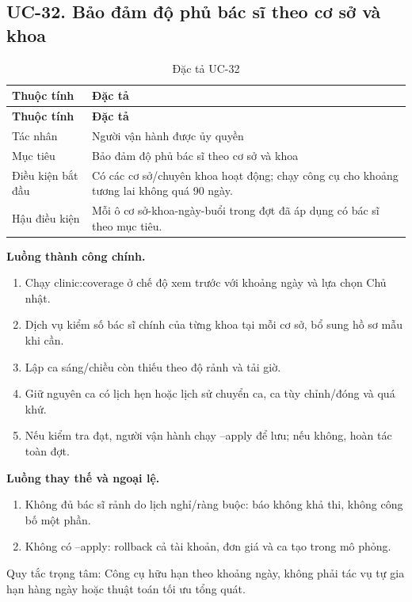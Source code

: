 \clearpage

\subsection{UC-32.\allowbreak{} Bảo đảm độ phủ bác sĩ theo cơ sở và khoa}
\label{uc:32}

{\small\setlength{\tabcolsep}{3pt}\renewcommand{\arraystretch}{1.12}
\begin{longtable}{@{}L{\textwidth-1.32pt\relax} L{\textwidth-4.68pt\relax}@{}}
\caption{Đặc tả UC-32}\\
\toprule
\textbf{Thuộc tính} & \textbf{Đặc tả}\\\midrule
\endfirsthead
\toprule
\textbf{Thuộc tính} & \textbf{Đặc tả}\\\midrule
\endhead
\bottomrule\endlastfoot
Tác nhân & Người vận hành được ủy quyền\\[3pt]
Mục tiêu & Bảo đảm độ phủ bác sĩ theo cơ sở và khoa\\[3pt]
Điều kiện bắt đầu & Có các cơ sở/\allowbreak{}chuyên khoa hoạt động; chạy công cụ cho khoảng tương lai không quá 90 ngày.\allowbreak{}\\[3pt]
Hậu điều kiện & Mỗi ô cơ sở-khoa-ngày-buổi trong đợt đã áp dụng có bác sĩ theo mục tiêu.\allowbreak{}\\[3pt]
\end{longtable}}
\noindent\textbf{Luồng thành công chính.}
\begin{enumerate}
\item Chạy clinic:\allowbreak{}coverage ở chế độ xem trước với khoảng ngày và lựa chọn Chủ nhật.\allowbreak{}
\item Dịch vụ kiểm số bác sĩ chính của từng khoa tại mỗi cơ sở, bổ sung hồ sơ mẫu khi cần.\allowbreak{}
\item Lập ca sáng/\allowbreak{}chiều còn thiếu theo độ rảnh và tải giờ.\allowbreak{}
\item Giữ nguyên ca có lịch hẹn hoặc lịch sử chuyển ca, ca tùy chỉnh/\allowbreak{}đóng và quá khứ.\allowbreak{}
\item Nếu kiểm tra đạt, người vận hành chạy --apply để lưu; nếu không, hoàn tác toàn đợt.\allowbreak{}
\end{enumerate}
\noindent\textbf{Luồng thay thế và ngoại lệ.}
\begin{enumerate}
\item Không đủ bác sĩ rảnh do lịch nghỉ/\allowbreak{}ràng buộc:\allowbreak{} báo không khả thi, không công bố một phần.\allowbreak{}
\item Không có --apply:\allowbreak{} rollback cả tài khoản, đơn giá và ca tạo trong mô phỏng.\allowbreak{}
\end{enumerate}
Quy tắc trọng tâm:\allowbreak{} Công cụ hữu hạn theo khoảng ngày, không phải tác vụ tự gia hạn hàng ngày hoặc thuật toán tối ưu tổng quát.\allowbreak{}

